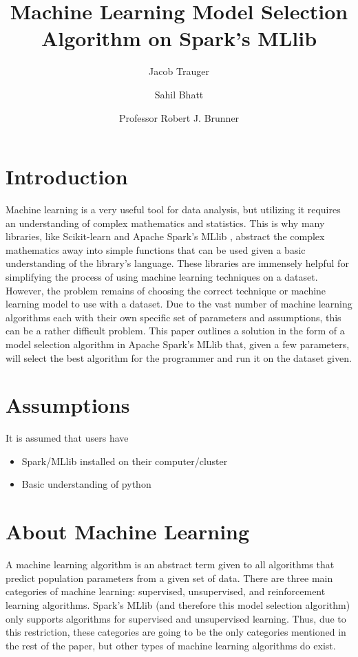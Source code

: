 \documentclass[9pt,twocolumn,twoside]{idsi}
\author[1]{Jacob Trauger}
\author[1]{Sahil Bhatt}
\author[2]{Professor Robert J. Brunner}
\affil[1]{Illinois Data Science Initiative}
\affil[2]{Laboratory for Computation, Data, and Machine Learning}
\title{Machine Learning Model Selection Algorithm on Spark's MLlib}
\begin{document}

\maketitle


\section{Introduction} 
Machine learning is a very useful tool for data analysis, but utilizing it requires an understanding of complex mathematics and statistics. This is why many libraries, like Scikit-learn \cite{scikit_learn} and Apache Spark's MLlib \cite{spark_mllib}, abstract the complex mathematics away into simple functions that can be used given a basic understanding of the library's language. These libraries are immensely helpful for simplifying the process of using machine learning techniques on a dataset. However, the problem remains of choosing the correct technique or machine learning model to use with a dataset. Due to the vast number of machine learning algorithms each with their own specific set of parameters and assumptions, this can be a rather difficult problem. 
This paper outlines a solution in the form of a model selection algorithm in Apache Spark's MLlib that, given a few parameters, will select the best algorithm for the programmer and run it on the dataset given. 

\section{Assumptions}
It is assumed that users have 
\begin{itemize}
\item Spark/MLlib installed on their computer/cluster
\item Basic understanding of python
\end{itemize}

\section{About Machine Learning}
A machine learning algorithm is an abstract term given to all algorithms that predict population parameters from a given set of data. There are three main categories of machine learning: supervised, unsupervised, and reinforcement learning algorithms. Spark's MLlib \cite{spark_mllib} (and therefore this model selection algorithm) only supports algorithms for supervised and unsupervised learning. Thus, due to this restriction, these categories are going to be the only categories mentioned in the rest of the paper, but other types of machine learning algorithms do exist. 
\end{document}
